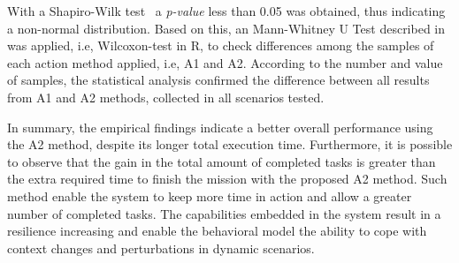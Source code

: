 With a Shapiro-Wilk test~\citep{stat001} a \textit{p-value} less than 0.05 was obtained, thus indicating a non-normal distribution. Based on this, an Mann-Whitney U Test described in~\cite{stat002} was applied, i.e, Wilcoxon-test in R, to check differences among the samples of each action method applied, i.e, A1 and A2. According to the number and value of samples, the statistical analysis confirmed the difference between all results from A1 and A2 methods, collected in all scenarios tested.

In summary, the empirical findings indicate a better overall performance using the A2 method, despite its longer total execution time. Furthermore, it is possible to observe that the gain in the total amount of completed tasks is greater than the extra required time to finish the mission with the proposed A2 method. Such method enable the system to keep more time in action and allow a greater number of completed tasks. The capabilities embedded in the system result in a resilience increasing and enable the behavioral model the ability to cope with context changes and perturbations in dynamic scenarios.
 

